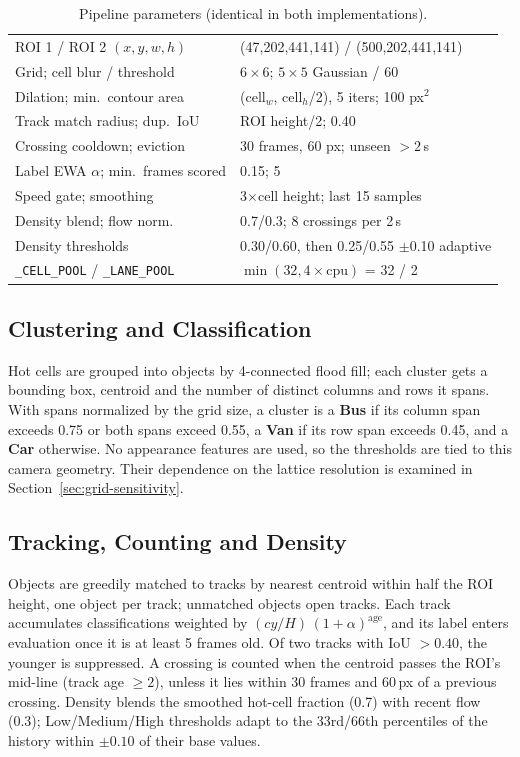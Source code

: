 \documentclass[conference]{IEEEtran}
\newcommand{\code}[1]{\texttt{#1}}
\begin{document}
\begin{table}[t]
\centering
\caption{Pipeline parameters (identical in both implementations).}
\label{tab:params}
\scriptsize
\setlength{\tabcolsep}{3pt}
\begin{tabular}{ll}
\toprule
ROI 1 / ROI 2 $(x,y,w,h)$ & (47,202,441,141) / (500,202,441,141) \\
Grid; cell blur / threshold & $6\times6$; $5\times5$ Gaussian / 60 \\
Dilation; min.\ contour area & (cell$_w$, cell$_h$/2), 5 iters; 100 px$^2$ \\
Track match radius; dup.\ IoU & ROI height/2; 0.40 \\
Crossing cooldown; eviction & 30 frames, 60 px; unseen $>2$\,s \\
Label EWA $\alpha$; min.\ frames scored & 0.15; 5 \\
Speed gate; smoothing & 3$\times$cell height; last 15 samples \\
Density blend; flow norm. & 0.7/0.3; 8 crossings per 2\,s \\
Density thresholds & 0.30/0.60, then 0.25/0.55 $\pm$0.10 adaptive \\
\code{\_CELL\_POOL} / \code{\_LANE\_POOL} & $\min(32,4{\times}\text{cpu})$ = 32 / 2 \\
\bottomrule
\end{tabular}
\end{table}

\subsection{Clustering and Classification}
\label{sec:classify}
Hot cells are grouped into objects by 4-connected flood fill; each
cluster gets a bounding box, centroid and the number of distinct columns
and rows it spans. With spans normalized by the grid size, a cluster is
a \textbf{Bus} if its column span exceeds 0.75 or both spans exceed
0.55, a \textbf{Van} if its row span exceeds 0.45, and a \textbf{Car}
otherwise. No appearance features are used, so the thresholds are tied
to this camera geometry. Their dependence on the lattice resolution is
examined in Section~\ref{sec:grid-sensitivity}.

\subsection{Tracking, Counting and Density}
\label{sec:tracking}
Objects are greedily matched to tracks by nearest centroid within half
the ROI height, one object per track; unmatched objects open tracks.
Each track accumulates classifications weighted by
$(cy/H)\,(1{+}\alpha)^{\text{age}}$, and its label enters evaluation once
it is at least 5 frames old. Of two tracks with IoU $>0.40$, the younger
is suppressed. A crossing is counted when the centroid passes the ROI's
mid-line (track age $\geq 2$), unless it lies within 30 frames and 60\,px
of a previous crossing. Density blends the smoothed hot-cell fraction
(0.7) with recent flow (0.3); Low/Medium/High thresholds adapt to the
33rd/66th percentiles of the history within $\pm0.10$ of their base
values.
\end{document}

